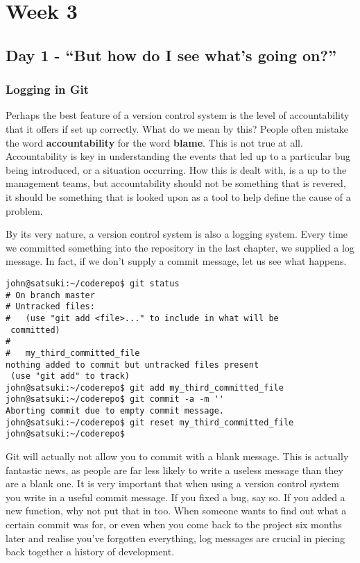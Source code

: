 \cleardoublepage

\chapter{Week 3}
\section{Day 1 - ``But how do I see what's going on?''}
\subsection{Logging in Git}

Perhaps the best feature of a version control system is the level of accountability that it offers if set up correctly.  What do we mean by this?  People often mistake the word \textbf{accountability} for the word \textbf{blame}.  This is not true at all.  Accountability is key in understanding the events that led up to a particular bug being introduced, or a situation occurring.  How this is dealt with, is a up to the management teams, but accountability should not be something that is revered, it should be something that is looked upon as a tool to help define the cause of a problem.

By its very nature, a version control system is also a logging system.  Every time we committed something into the repository in the last chapter, we supplied a log message.  In fact, if we don't supply a commit message, let us see what happens.

\begin{Verbatim}
john@satsuki:~/coderepo$ git status
# On branch master
# Untracked files:
#   (use "git add <file>..." to include in what will be 
 committed)
#
#	my_third_committed_file
nothing added to commit but untracked files present 
 (use "git add" to track)
john@satsuki:~/coderepo$ git add my_third_committed_file
john@satsuki:~/coderepo$ git commit -a -m ''
Aborting commit due to empty commit message.
john@satsuki:~/coderepo$ git reset my_third_committed_file
john@satsuki:~/coderepo$ 
\end{Verbatim}

Git will actually not allow you to commit with a blank message.  This is actually fantastic news, as people are far less likely to write a useless message than they are a blank one.  It is very important that when using a version control system you write in a useful commit message.  If you fixed a bug, say so.  If you added a new function, why not put that in too.  When someone wants to find out what a certain commit was for, or even when you come back to the project six months later and realise you've forgotten everything, log messages are crucial in piecing back together a history of development.

